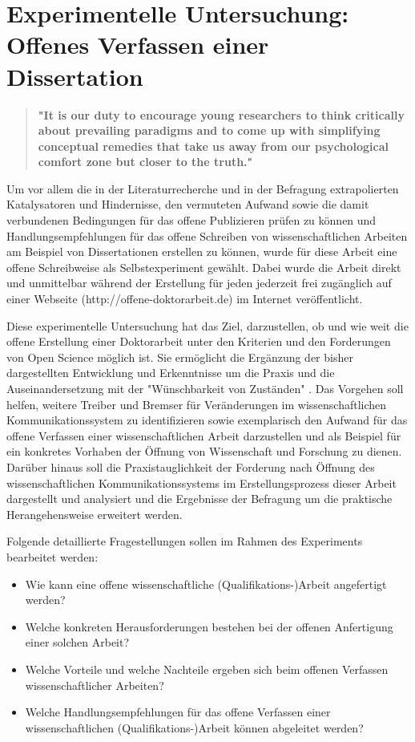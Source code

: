 \chapter{Experimentelle Untersuchung: Offenes Verfassen einer Dissertation}

\begin{quote}
\textbf{"It is our duty to encourage young researchers to think critically about prevailing paradigms and to come up with simplifying conceptual remedies that take us away from our psychological comfort zone but closer to the truth."}
\end{quote} \cite[:386]{Loeb_2013}

Um vor allem die in der Literaturrecherche und in der Befragung extrapolierten Katalysatoren und Hindernisse, den vermuteten Aufwand sowie die damit verbundenen Bedingungen für das offene Publizieren prüfen zu können und Handlungsempfehlungen für das offene Schreiben von wissenschaftlichen Arbeiten am Beispiel von Dissertationen erstellen zu können, wurde für diese Arbeit eine offene Schreibweise als Selbstexperiment gewählt. Dabei wurde die Arbeit direkt und unmittelbar während der Erstellung für jeden jederzeit frei zugänglich auf einer Webseite (http://offene-doktorarbeit.de) im Internet veröffentlicht.

Diese experimentelle Untersuchung hat das Ziel, darzustellen, ob und wie weit die offene Erstellung einer Doktorarbeit unter den Kriterien und den Forderungen von Open Science möglich ist. Sie ermöglicht die Ergänzung der bisher dargestellten Entwicklung und Erkenntnisse um die Praxis und die Auseinandersetzung mit der "Wünschbarkeit von Zuständen" \cite{cite:10}. Das Vorgehen soll helfen, weitere Treiber und Bremser für Veränderungen im wissenschaftlichen Kommunikationssystem zu identifizieren sowie exemplarisch den Aufwand für das offene Verfassen einer wissenschaftlichen Arbeit darzustellen und als Beispiel für ein konkretes Vorhaben der Öffnung von Wissenschaft und Forschung zu dienen. Darüber hinaus soll die Praxistauglichkeit der Forderung nach Öffnung des wissenschaftlichen Kommunikationssystems im Erstellungsprozess dieser Arbeit dargestellt und analysiert und die Ergebnisse der Befragung um die praktische Herangehensweise erweitert werden.

Folgende detaillierte Fragestellungen sollen im Rahmen des Experiments bearbeitet werden:
\begin{itemize}
\item Wie kann eine offene wissenschaftliche (Qualifikations-)Arbeit angefertigt werden?
\item Welche konkreten Herausforderungen bestehen bei der offenen Anfertigung einer solchen Arbeit?
\item Welche Vorteile und welche Nachteile ergeben sich beim offenen Verfassen wissenschaftlicher Arbeiten?
\item Welche Handlungsempfehlungen für das offene Verfassen einer wissenschaftlichen (Qualifikations-)Arbeit können abgeleitet werden?
\end{itemize}

